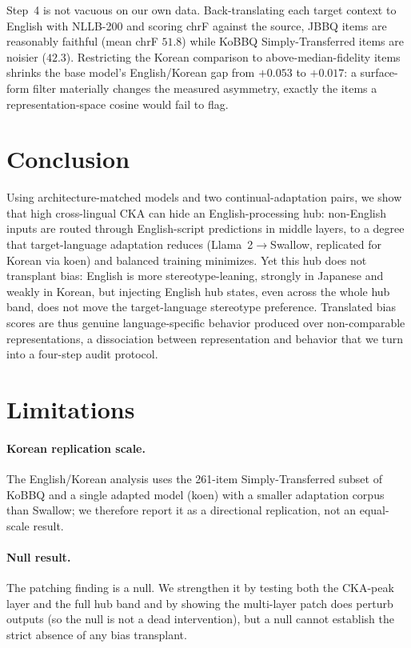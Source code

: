 \documentclass[11pt]{article}
\begin{document}
Step~4 is not vacuous on our own data. Back-translating each target context to English with NLLB-200 \citep{nllb2022} and scoring chrF against the source, JBBQ items are reasonably faithful (mean chrF $51.8$) while KoBBQ Simply-Transferred items are noisier ($42.3$). Restricting the Korean comparison to above-median-fidelity items shrinks the base model's English/Korean gap from $+0.053$ to $+0.017$: a surface-form filter materially changes the measured asymmetry, exactly the items a representation-space cosine would fail to flag.

\section{Conclusion}

Using architecture-matched models and two continual-adaptation pairs, we show that high cross-lingual CKA can hide an English-processing hub: non-English inputs are routed through English-script predictions in middle layers, to a degree that target-language adaptation reduces (Llama~2$\to$Swallow, replicated for Korean via koen) and balanced training minimizes. Yet this hub does not transplant bias: English is more stereotype-leaning, strongly in Japanese and weakly in Korean, but injecting English hub states, even across the whole hub band, does not move the target-language stereotype preference. Translated bias scores are thus genuine language-specific behavior produced over non-comparable representations, a dissociation between representation and behavior that we turn into a four-step audit protocol.

\section*{Limitations}

\paragraph{Korean replication scale.} The English/Korean analysis uses the 261-item Simply-Transferred subset of KoBBQ and a single adapted model (koen) with a smaller adaptation corpus than Swallow; we therefore report it as a directional replication, not an equal-scale result.

\paragraph{Null result.} The patching finding is a null. We strengthen it by testing both the CKA-peak layer and the full hub band and by showing the multi-layer patch does perturb outputs (so the null is not a dead intervention), but a null cannot establish the strict absence of any bias transplant.
\end{document}
